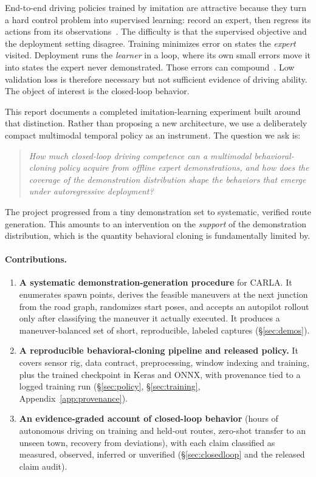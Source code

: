\documentclass[11pt]{article}
\begin{document}
End-to-end driving policies trained by imitation are attractive because they turn a hard control problem into supervised learning: record an expert, then regress its actions from its observations~\cite{dosovitskiy2017carla,bojarski2016end}. The difficulty is that the supervised objective and the deployment setting disagree. Training minimizes error on states the \emph{expert} visited. Deployment runs the \emph{learner} in a loop, where its own small errors move it into states the expert never demonstrated. Those errors can compound~\cite{ross2011dagger}. Low validation loss is therefore necessary but not sufficient evidence of driving ability. The object of interest is the closed-loop behavior.

This report documents a completed imitation-learning experiment built around that distinction. Rather than proposing a new architecture, we use a deliberately compact multimodal temporal policy as an instrument. The question we ask is:

\begin{quote}
\itshape How much closed-loop driving competence can a multimodal behavioral-cloning policy acquire from offline expert demonstrations, and how does the coverage of the demonstration distribution shape the behaviors that emerge under autoregressive deployment?
\end{quote}

The project progressed from a tiny demonstration set to systematic, verified route generation. This amounts to an intervention on the \emph{support} of the demonstration distribution, which is the quantity behavioral cloning is fundamentally limited by.

\paragraph{Contributions.}
\begin{enumerate}
  \item \textbf{A systematic demonstration-generation procedure} for CARLA. It enumerates spawn points, derives the feasible maneuvers at the next junction from the road graph, randomizes start poses, and accepts an autopilot rollout only after classifying the maneuver it actually executed. It produces a maneuver-balanced set of short, reproducible, labeled captures (\S\ref{sec:demos}).
  \item \textbf{A reproducible behavioral-cloning pipeline and released policy.} It covers sensor rig, data contract, preprocessing, window indexing and training, plus the trained checkpoint in Keras and ONNX, with provenance tied to a logged training run (\S\ref{sec:policy}, \S\ref{sec:training}, Appendix~\ref{app:provenance}).
  \item \textbf{An evidence-graded account of closed-loop behavior} (hours of autonomous driving on training and held-out routes, zero-shot transfer to an unseen town, recovery from deviations), with each claim classified as measured, observed, inferred or unverified (\S\ref{sec:closedloop} and the released claim audit).
\end{enumerate}
\end{document}
